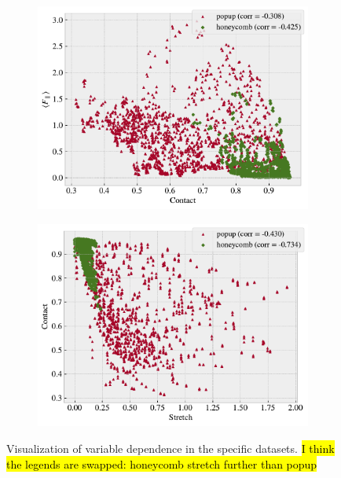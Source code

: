 \begin{figure}[H]
\begin{subfigure}[t]{0.32\textwidth}
      \includegraphics[width=\textwidth]{figures/ML/corr_contact_Ff.pdf}
      \caption{}
  \end{subfigure}
  \hfill
  \begin{subfigure}[t]{0.32\textwidth}
      \centering
      \includegraphics[width=\textwidth]{figures/ML/corr_stretch_contact.pdf}
      \caption{}
  \end{subfigure}
  \hfill
     \caption{Visualization of variable dependence in the specific datasets. \hl{I think the legends are swapped: honeycomb stretch further than popup}}
     \label{fig:corr_vis}
\end{figure}


